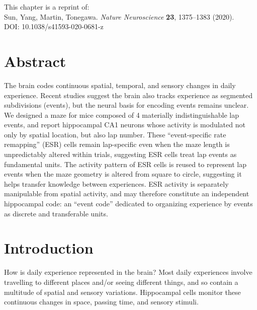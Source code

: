 This chapter is a reprint of: \\
Sun, Yang, Martin, Tonegawa. \textit{Nature Neuroscience} \textbf{23}, 1375--1383 (2020). \\
DOI: 10.1038/s41593-020-0681-z

\section*{Abstract}

The brain codes continuous spatial, temporal, and sensory changes in daily experience. Recent studies suggest the brain also tracks experience as segmented subdivisions (events), but the neural basis for encoding events remains unclear. We designed a maze for mice composed of 4 materially indistinguishable lap events, and report hippocampal CA1 neurons whose activity is modulated not only by spatial location, but also lap number. These ``event-specific rate remapping'' (ESR) cells remain lap-specific even when the maze length is unpredictably altered within trials, suggesting ESR cells treat lap events as fundamental units. The activity pattern of ESR cells is reused to represent lap events when the maze geometry is altered from square to circle, suggesting it helps transfer knowledge between experiences. ESR activity is separately manipulable from spatial activity, and may therefore constitute an independent hippocampal code: an ``event code'' dedicated to organizing experience by events as discrete and transferable units.

\section{Introduction}

How is daily experience represented in the brain? Most daily experiences involve travelling to different places and/or seeing different things, and so contain a multitude of spatial and sensory variations. Hippocampal cells monitor these continuous changes in space, passing time, and sensory stimuli\cite{sun2020}.

